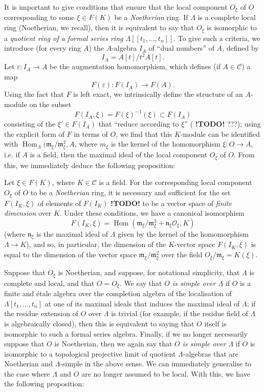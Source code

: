 \documentclass{article}
\theoremstyle{plain}
\newenvironment{proposition}[1]
  {\renewcommand\theinnercustomproposition{#1}\innercustomproposition}
  {\endinnercustomproposition}
\theoremstyle{definition}
\newcommand{\sh}[1]{{\mathscr{#1}}}
\newcommand{\cat}[1]{{\mathcal{#1}}}
\newcommand{\fk}[1]{{\mathfrak{#1}}}
\DeclareMathOperator{\Hom}{Hom}
\newcommand{\todo}{\textbf{ !TODO! }}
\newcommand{\oldpage}[1]{\marginpar{\footnotesize$\Big\vert$ \textit{p.~#1}}}
\begin{document}
It is important to give conditions that ensure that the local component $O_\xi$ of $O$ corresponding to some $\xi\in F(K)$ be a \emph{Noetherian} ring.
If $\Lambda$ is a complete local ring (Noetherian, we recall), then it is equivalent to say that $O_\xi$ is isomorphic to a \emph{quotient ring of a formal series ring $\Lambda[[t_1,\ldots,t_n]]$}.
To give such a criteria, we introduce (for every ring $A$) the $A$-algebra $I_A$ of ``dual numbers'' of $A$, defined by
\[
  I_A = A[t]/t^2A[t].
\]
Let $\varepsilon\colon I_A\to A$ be the augmentation homomorphism, which defines (if $A\in\cat{C}$) a map
\[
  F(\varepsilon)\colon F(I_A) \to F(A).
\]
\oldpage{195-08}
Using the fact that $F$ is left exact, we intrinsically define the structure of an $A$-module on the subset
\[
  F(I_A,\xi) = F(\xi)^{-1}(\xi) \subset F(I_A)
\]
consisting of the $\xi'\in F(I_A)$ that ``reduce according to $\xi$'' (\todo???);
using the explicit form of $F$ in terms of $O$, we find that this $K$-module can be identified with $\Hom_\Lambda(\fk{m}_\xi/\fk{m}_\xi^2,A$, where $m_\xi$ is the kernel of the homomorphism $\xi\colon O\to A$, i.e. if $A$ is a field, then the maximal ideal of the local component $O_\xi$ of $O$.
From this, we immediately deduce the following proposition:

\begin{proposition}{5.1}
\label{A.5-proposition1}
  Let $\xi\in F(K)$, where $K\in\cat{C}$ is a field.
  For the corresponding local component $O_\xi$ of $O$ to be a \emph{Noetherian} ring, it is necessary and sufficient for the set $F(I_K,\xi)$ of elements of $F(I_K)$ \todo to be a vector space of \emph{finite dimension} over $K$.
  Under these conditions, we have a canonical isomorphism
  \[
    F(I_K,\xi) = \Hom(\fk{m}_\xi/\fk{m}_\xi^2+\fk{n}_\xi\sh{O}_\xi, K)
  \]
  (where $\fk{n}_\xi$ is the maximal ideal of $\Lambda$ given by the kernel of the homomorphism $\Lambda\to K$), and so, in particular, the dimension of the $K$-vector space $F(I_K,\xi)$ is equal to the dimension of the vector space $\fk{m}_\xi/\fk{m}_\xi^2$ over the field $O_\xi/\fk{m}_\xi=K(\xi)$.
\end{proposition}

Suppose that $O_\xi$ is Noetherian, and suppose, for notational simplicity, that $\Lambda$ is complete and local, and that $O=O_\xi$.
We say that \emph{$O$ is simple over $\Lambda$} if $O$ is a finite and \'{e}tale algebra over the completion algebra of the localisation of $\Lambda[t_1,\ldots,t_n]$ at one of its maximal ideals that induces the maximal ideal of $\Lambda$;
if the residue extension of $O$ over $\Lambda$ is trivial (for example, if the residue field of $\Lambda$ is algebraically closed), then this is equivalent to saying that $O$ itself is isomorphic to such a formal series algebra.
Finally, if we no longer necessarily suppose that $O$ is Noetherian, then we again say that \emph{$O$ is simple over $\Lambda$} if $O$ is isomorphic to a topological projective limit of quotient $\Lambda$-algebras that are Noetherian and $\Lambda$-simple in the above sense.
We can immediately generalise to the case where $\Lambda$ and $O$ are no longer assumed to be local.
With this, we have the following proposition:
\end{document}
